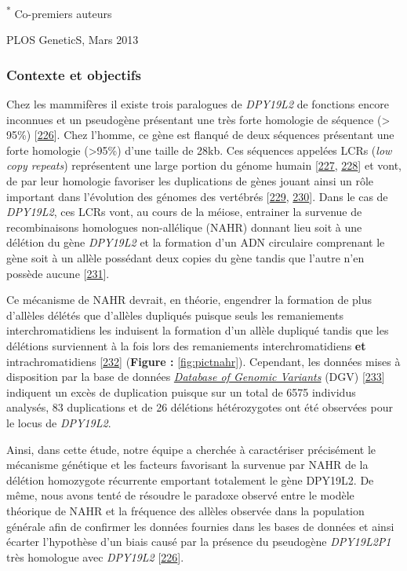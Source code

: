 \documentclass[12pt,a4paper,twoside]{ugathesis}
\theoremstyle{definition}
\theoremstyle{definition}
\theoremstyle{definition}
\theoremstyle{remark}
\begin{document}
\textsuperscript{*} Co-premiers auteurs

PLOS GeneticS, Mars 2013

\newpage

\subsubsection{Contexte et objectifs}\label{contexte-et-objectifs-5}

Chez les mammifères il existe trois paralogues de \emph{DPY19L2} de
fonctions encore inconnues et un pseudogène présentant une très forte
homologie de séquence (\textgreater{} 95\%)
{[}\protect\hyperlink{ref-Carson2006}{226}{]}. Chez l'homme, ce gène est
flanqué de deux séquences présentant une forte homologie
(\textgreater{}95\%) d'une taille de 28kb. Ces séquences appelées LCRs
(\emph{low copy repeats}) représentent une large portion du génome
humain {[}\protect\hyperlink{ref-Cheung2003}{227},
\protect\hyperlink{ref-Bailey2002}{228}{]} et vont, de par leur
homologie favoriser les duplications de gènes jouant ainsi un rôle
important dans l'évolution des génomes des vertébrés
{[}\protect\hyperlink{ref-Walsh2003}{229},
\protect\hyperlink{ref-Ohno1970}{230}{]}. Dans le cas de \emph{DPY19L2},
ces LCRs vont, au cours de la méiose, entrainer la survenue de
recombinaisons homologues non-allélique (NAHR) donnant lieu soit à une
délétion du gène \emph{DPY19L2} et la formation d'un ADN circulaire
comprenant le gène soit à un allèle possédant deux copies du gène tandis
que l'autre n'en possède aucune
{[}\protect\hyperlink{ref-Harbuz2011a}{231}{]}.

Ce mécanisme de NAHR devrait, en théorie, engendrer la formation de plus
d'allèles délétés que d'allèles dupliqués puisque seuls les remaniements
interchromatidiens les induisent la formation d'un allèle dupliqué
tandis que les délétions surviennent à la fois lors des remaniements
interchromatidiens \textbf{et} intrachromatidiens
{[}\protect\hyperlink{ref-Liu2012}{232}{]} (\textbf{Figure :
}\ref{fig:pictnahr}). Cependant, les données mises à disposition par la
base de données \href{http://dgv.tcag.ca/dgv/app/home}{\emph{Database of
Genomic Variants}} (DGV)
{[}\protect\hyperlink{ref-MacDonald2014}{233}{]} indiquent un excès de
duplication puisque sur un total de 6575 individus analysés, 83
duplications et de 26 délétions hétérozygotes ont été observées pour le
locus de \emph{DPY19L2}.

Ainsi, dans cette étude, notre équipe a cherchée à caractériser
précisément le mécanisme génétique et les facteurs favorisant la
survenue par NAHR de la délétion homozygote récurrente emportant
totalement le gène DPY19L2. De même, nous avons tenté de résoudre le
paradoxe observé entre le modèle théorique de NAHR et la fréquence des
allèles observée dans la population générale afin de confirmer les
données fournies dans les bases de données et ainsi écarter l'hypothèse
d'un biais causé par la présence du pseudogène \emph{DPY19L2P1} très
homologue avec \emph{DPY19L2}
{[}\protect\hyperlink{ref-Carson2006}{226}{]}.
\end{document}
